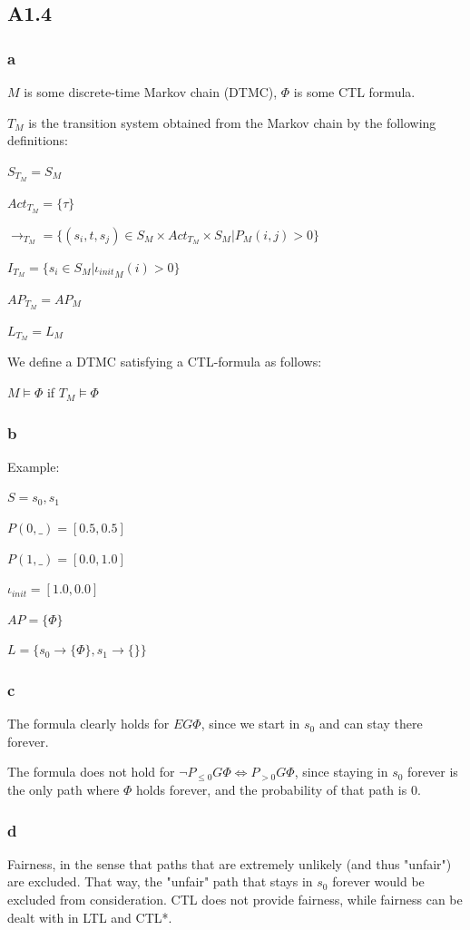 \subsection{A1.4}

\subsubsection{a}

$M$ is some discrete-time Markov chain (DTMC),
$\Phi$ is some CTL formula.

$T_M$ is the transition system obtained from the Markov chain
by the following definitions:

$S_{T_M} = S_M$

$Act_{T_M} = \{\tau\}$

$\to_{T_M} = \{(s_i, t, s_j) \in S_M \times Act_{T_M} \times S_M | P_M(i, j) > 0\}$

$I_{T_M} = \{s_i \in S_M | {\iota_{init}}_M(i) > 0\}$

$AP_{T_M} = AP_M$

$L_{T_M} = L_M$

We define a DTMC satisfying a CTL-formula as follows:

$M \models \Phi$ if $T_M \models \Phi$

\subsubsection{b}

Example:

$S = {s_0, s_1}$

$P(0, \_) = [0.5, 0.5]$

$P(1, \_) = [0.0, 1.0]$

$\iota_{init} = [1.0, 0.0]$

$AP = \{\Phi\}$

$L = \{s_0 \to \{\Phi\}, s_1 \to \{\}\}$

\subsubsection{c}

The formula clearly holds for $EG \Phi$,
since we start in $s_0$ and can stay there
forever.

The formula does not hold for $\neg P_{\leq 0} G \Phi \Leftrightarrow P_{>0} G \Phi$,
since staying in $s_0$ forever is the only
path where $\Phi$ holds forever,
and the probability of that path is 0.

\subsubsection{d}

Fairness, in the sense that paths that are extremely unlikely (and thus "unfair")
are excluded.
That way, the "unfair" path that stays in $s_0$ forever would be excluded from consideration.
CTL does not provide fairness, while fairness can be dealt with in LTL and CTL*.

